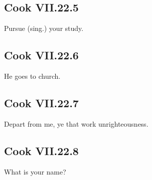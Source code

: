 \par\begin{minipage}{\linewidth}\raggedright
\subsection*{Cook VII.22.5}

Pursue (sing.) your study.

\end{minipage}\par\addvspace{4pt}

\par\begin{minipage}{\linewidth}\raggedright
\subsection*{Cook VII.22.6}

He goes to church.

\end{minipage}\par\addvspace{4pt}

\par\begin{minipage}{\linewidth}\raggedright
\subsection*{Cook VII.22.7}

Depart from me, ye that work unrighteousness.

\end{minipage}\par\addvspace{4pt}

\par\begin{minipage}{\linewidth}\raggedright
\subsection*{Cook VII.22.8}

What is your name?

\end{minipage}\par\addvspace{4pt}

